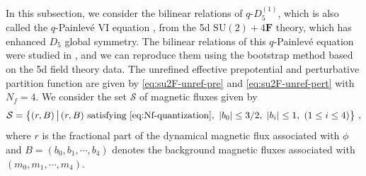\documentclass[11pt, a4paper]{article}
\theoremstyle{definition}
\begin{document}
In this subsection, we consider the bilinear relations of $ q\text{-}D_5^{(1)} $, which is also called the $ q $-Painlev\'e VI equation \cite{Jimbo:1995}, from the 5d $ \mathrm{SU}(2)+4\mathbf{F} $ theory, which has enhanced $ D_5 $ global symmetry. The bilinear relations of this $ q $-Painlev\'e equation were studied in \cite{Tsuda:2006, Jimbo:2017ael}, and we can reproduce them using the bootstrap method based on the 5d field theory data. The unrefined effective prepotential and perturbative partition function are given by \eqref{eq:su2F-unref-pre} and \eqref{eq:su2F-unref-pert} with $ N_f=4 $. We consider the set $ \mathcal{S} $ of magnetic fluxes given by
\begin{align}
    \mathcal{S} = \left\{ (r,B) \, \big| \, (r,B) \text{ satisfying \eqref{eq:Nf-quantization}}, \ |b_0| \leq 3/2 , \  |b_i| \leq 1 , \ (1 \leq i \leq 4) \right\} \, ,
\end{align}
where $ r $ is the fractional part of the dynamical magnetic flux associated with $ \phi $ and $ B = (b_0,b_1,\cdots,b_4) $ denotes the background magnetic fluxes associated with $ (m_0,m_1,\cdots,m_4) $.
\end{document}
